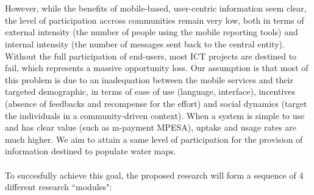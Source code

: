 \documentclass[11pt]{article}
\begin{document}
\\\\
However, while the benefits of mobile-based, user-centric information seem clear, the level of participation accross communities remain very low, both in terms of external intensity (the number of people using the mobile reporting tools) and internal intensity (the number of messages sent back to the central entity). Without the full participation of end-users, most ICT projects are destined to fail, which represents a massive opportunity loss. Our assumption is that most of this problem is due to an  inadequation between the mobile services and their targeted demographic, in terms of ease of use (language, interface), incentives (absence of feedbacks and recompense for the effort) and social dynamics (target the individuals in a community-driven context). When a system is simple to use and has clear value (such as m-payment MPESA), uptake and usage rates are much higher. We aim to attain a same level of participation for the provision of information destined to populate water maps.  
\\\\
To succesfully achieve this goal, the proposed research will form a sequence of 4 different research ``modules":
\end{document}
